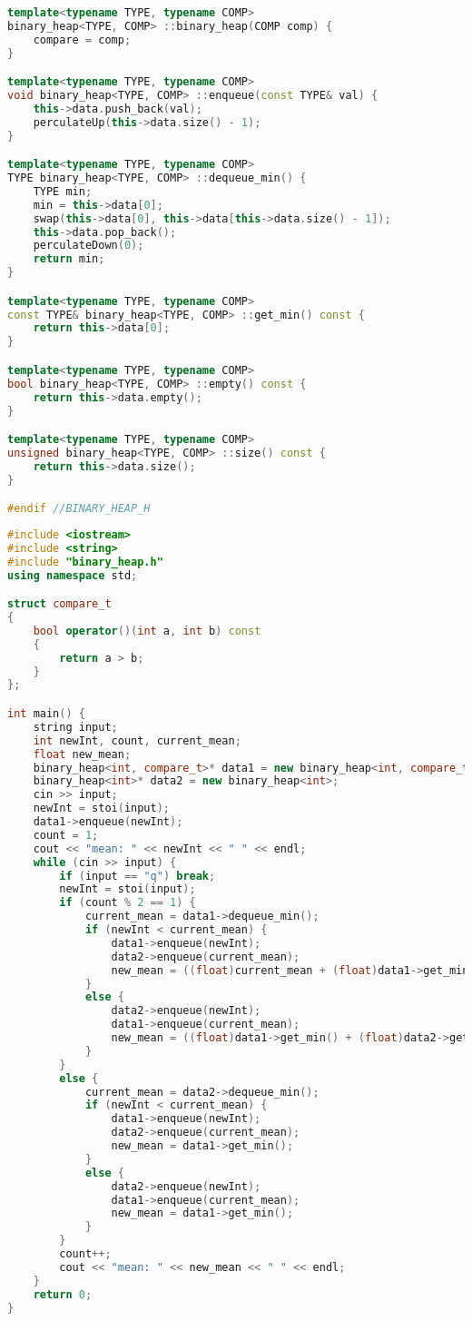 \documentclass[12pt,a4paper]{article}
\theoremstyle{definition}
\begin{document}
\begin{enumerate}
\begin{lstlisting}[language=C++]
template<typename TYPE, typename COMP>
binary_heap<TYPE, COMP> ::binary_heap(COMP comp) {
	compare = comp;
}

template<typename TYPE, typename COMP>
void binary_heap<TYPE, COMP> ::enqueue(const TYPE& val) {
	this->data.push_back(val);
	perculateUp(this->data.size() - 1);
}

template<typename TYPE, typename COMP>
TYPE binary_heap<TYPE, COMP> ::dequeue_min() {
	TYPE min;
	min = this->data[0];
	swap(this->data[0], this->data[this->data.size() - 1]);
	this->data.pop_back();
	perculateDown(0);
	return min;
}

template<typename TYPE, typename COMP>
const TYPE& binary_heap<TYPE, COMP> ::get_min() const {
	return this->data[0];
}

template<typename TYPE, typename COMP>
bool binary_heap<TYPE, COMP> ::empty() const {
	return this->data.empty();
}

template<typename TYPE, typename COMP>
unsigned binary_heap<TYPE, COMP> ::size() const {
	return this->data.size();
}

#endif //BINARY_HEAP_H
\end{lstlisting}

\begin{lstlisting}[language=C++]
#include <iostream>
#include <string>
#include "binary_heap.h"
using namespace std;

struct compare_t
{
	bool operator()(int a, int b) const
	{
		return a > b;
	}
};

int main() {
	string input;
	int newInt, count, current_mean;
	float new_mean;
	binary_heap<int, compare_t>* data1 = new binary_heap<int, compare_t>;
	binary_heap<int>* data2 = new binary_heap<int>;
	cin >> input;
	newInt = stoi(input);
	data1->enqueue(newInt);
	count = 1;
	cout << "mean: " << newInt << " " << endl;
	while (cin >> input) {
		if (input == "q") break;
		newInt = stoi(input);
		if (count % 2 == 1) {
			current_mean = data1->dequeue_min();
			if (newInt < current_mean) {
				data1->enqueue(newInt);
				data2->enqueue(current_mean);
				new_mean = ((float)current_mean + (float)data1->get_min()) / 2;
			}
			else {
				data2->enqueue(newInt);
				data1->enqueue(current_mean);
				new_mean = ((float)data1->get_min() + (float)data2->get_min()) / 2;
			}
		}
		else {
			current_mean = data2->dequeue_min();
			if (newInt < current_mean) {
				data1->enqueue(newInt);
				data2->enqueue(current_mean);
				new_mean = data1->get_min();
			}
			else {
				data2->enqueue(newInt);
				data1->enqueue(current_mean);
				new_mean = data1->get_min();
			}
		}
		count++;
		cout << "mean: " << new_mean << " " << endl;
	}
	return 0;
}
\end{lstlisting}


\end{enumerate}
\end{document}

